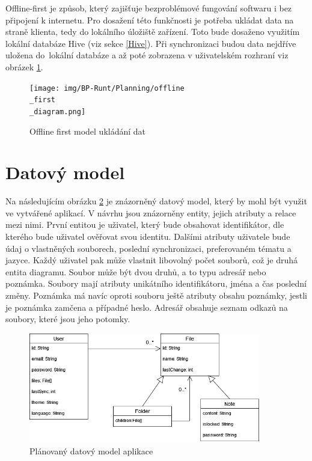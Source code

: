 \documentclass[czech, bc, kiv, he, iso690numb]{fasthesis}
\begin{document}
Offline-first je způsob, který zajišťuje bezproblémové fungování softwaru i bez připojení k internetu. Pro dosažení této funkčnosti je potřeba ukládat data na straně klienta, tedy do lokálního úložiště zařízení. Toto bude dosaženo využitím lokální databáze Hive (viz sekce \ref{Hive}). Při synchronizaci budou data nejdříve uložena do~lokální databáze a až poté zobrazena v uživatelském rozhraní viz obrázek \ref{fig:offline-first-model}.

\begin{figure}[h]
  \centering
  \texttt{[image: img/BP-Runt/Planning/offline\\\_first\\\_diagram.png]}
  \caption{Offline first model ukládání dat}
  \label{fig:offline-first-model}
\end{figure}

\section{Datový model}

Na následujícím obrázku \ref{fig:data-model} je znázorněný datový model, který by mohl být využit ve vytvářené aplikací. V návrhu jsou znázorněny entity, jejich atributy a relace mezi nimi. První entitou je uživatel, který bude obsahovat identifikátor, dle kterého bude uživatel ověřovat svou identitu. Dalšími atributy uživatele bude údaj o vlastněných souborech, poslední synchronizaci, preferovaném tématu a jazyce. Každý uživatel pak může vlastnit libovolný počet souborů, což je druhá entita diagramu. Soubor může být dvou druhů, a to typu adresář nebo poznámka. Soubory mají atributy unikátního identifikátoru, jména a čas poslední změny. Poznámka má navíc oproti souboru ještě atributy obsahu poznámky, jestli je poznámka zamčena a případné heslo. Adresář obsahuje seznam odkazů na soubory, které jsou jeho potomky.

\begin{figure}[h]
  \centering
  \includegraphics[width=0.9\textwidth]{img/BP-Runt/Planning/data-model-updated.png}
  \caption{Plánovaný datový model aplikace}
  \label{fig:data-model}
\end{figure}
\end{document}
